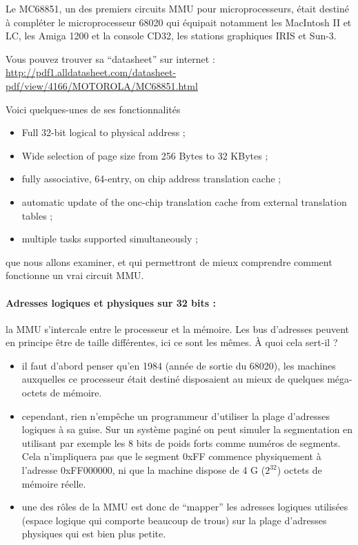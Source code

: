 \begin{multicols}{2}
Le MC68851, un des premiers circuits MMU pour microprocesseurs, était
destiné à compléter le microprocesseur 68020 qui équipait notamment
les MacIntosh II et LC, les Amiga 1200 et la console CD32, les
stations graphiques IRIS et Sun-3.

 Vous pouvez trouver sa ``datasheet'' 
sur internet : \url{ http://pdf1.alldatasheet.com/datasheet-pdf/view/4166/MOTOROLA/MC68851.html}

Voici quelques-unes de ses fonctionnalités
\begin{itemize}
\item Full 32-bit logical to physical address ;
\item Wide selection of page size from 256 Bytes to 32 KBytes ;
\item fully associative, 64-entry, on chip address translation cache ;
\item automatic update of the onc-chip translation cache from external translation tables ;
\item multiple tasks supported simultaneously ;
\end{itemize}
que nous allons examiner, et qui permettront de mieux comprendre comment
fonctionne un vrai circuit MMU.

\paragraph{Adresses logiques et physiques sur 32 bits : } la MMU s'intercale entre le processeur et la mémoire. Les bus d'adresses peuvent en principe être de taille différentes, ici ce sont les mêmes. À quoi cela sert-il ?
\begin{itemize}
\item il faut d'abord penser qu'en 1984 (année de sortie du 68020),
  les machines auxquelles ce processeur était destiné disposaient au
  mieux de quelques méga-octets de mémoire.
\item cependant, rien n'empêche un programmeur d'utiliser la plage
  d'adresses logiques à sa guise. Sur un système paginé on peut simuler la
  segmentation en utilisant par exemple les 8 bits de poids forts comme numéros de
  segments. Cela n'impliquera pas que le segment 0xFF commence physiquement
à l'adresse 0xFF000000, ni que la machine dispose de 4 G ($2^{32}$)
  octets de mémoire réelle.
\item une des rôles de la MMU est donc de ``mapper'' les adresses
  logiques utilisées (espace logique qui comporte beaucoup de trous)
  sur la plage d'adresses physiques qui est bien plus petite.
\end{itemize}


\end{multicols}
